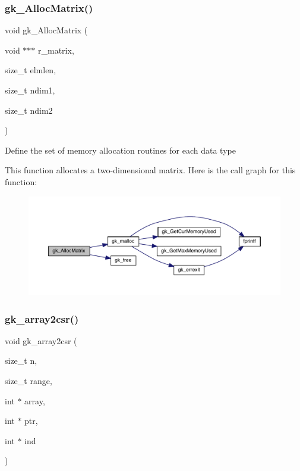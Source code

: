 \subsubsection{\texorpdfstring{gk\+\_\+\+Alloc\+Matrix()}{gk\_AllocMatrix()}}
{\footnotesize\ttfamily void gk\+\_\+\+Alloc\+Matrix (\begin{DoxyParamCaption}\item[{void $\ast$$\ast$$\ast$}]{r\+\_\+matrix,  }\item[{size\+\_\+t}]{elmlen,  }\item[{size\+\_\+t}]{ndim1,  }\item[{size\+\_\+t}]{ndim2 }\end{DoxyParamCaption})}

Define the set of memory allocation routines for each data type

This function allocates a two-\/dimensional matrix. Here is the call graph for this function\+:\nopagebreak
\begin{figure}[H]
\begin{center}
\leavevmode
\includegraphics[width=350pt]{a00077_a3b473198519d20a1558f436cff6029e0_cgraph}
\end{center}
\end{figure}
\mbox{\label{a00077_ab6b93b50df474335a0f8700e3f56e689}} 
\subsubsection{\texorpdfstring{gk\+\_\+array2csr()}{gk\_array2csr()}}
{\footnotesize\ttfamily void gk\+\_\+array2csr (\begin{DoxyParamCaption}\item[{size\+\_\+t}]{n,  }\item[{size\+\_\+t}]{range,  }\item[{int $\ast$}]{array,  }\item[{int $\ast$}]{ptr,  }\item[{int $\ast$}]{ind }\end{DoxyParamCaption})}



